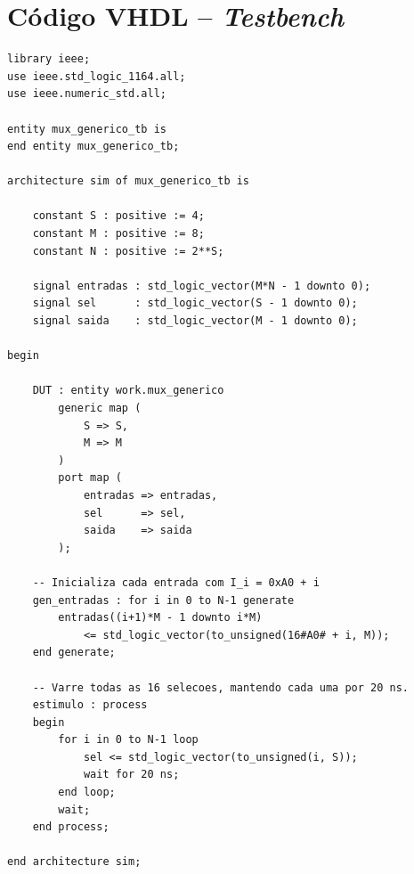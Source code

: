 \documentclass[12pt,a4paper, brazil]{article}
\begin{document}
\newpage
\section{Código VHDL -- \textit{Testbench}}
\label{ap:codigo-tb}

\begin{lstlisting}[style=vhdl, caption={Arquivo \texttt{mux\_generico\_tb.vhd} -- simulação com $S=4$, $M=8$ (16 entradas de 8 bits).}]
library ieee;
use ieee.std_logic_1164.all;
use ieee.numeric_std.all;

entity mux_generico_tb is
end entity mux_generico_tb;

architecture sim of mux_generico_tb is

    constant S : positive := 4;
    constant M : positive := 8;
    constant N : positive := 2**S;

    signal entradas : std_logic_vector(M*N - 1 downto 0);
    signal sel      : std_logic_vector(S - 1 downto 0);
    signal saida    : std_logic_vector(M - 1 downto 0);

begin

    DUT : entity work.mux_generico
        generic map (
            S => S,
            M => M
        )
        port map (
            entradas => entradas,
            sel      => sel,
            saida    => saida
        );

    -- Inicializa cada entrada com I_i = 0xA0 + i
    gen_entradas : for i in 0 to N-1 generate
        entradas((i+1)*M - 1 downto i*M)
            <= std_logic_vector(to_unsigned(16#A0# + i, M));
    end generate;

    -- Varre todas as 16 selecoes, mantendo cada uma por 20 ns.
    estimulo : process
    begin
        for i in 0 to N-1 loop
            sel <= std_logic_vector(to_unsigned(i, S));
            wait for 20 ns;
        end loop;
        wait;
    end process;

end architecture sim;
\end{lstlisting}
\end{document}
